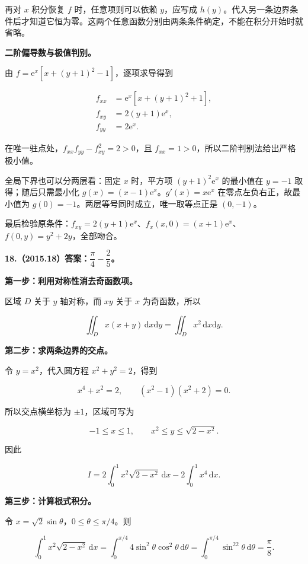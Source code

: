 \documentclass[UTF8,11pt,fontset=windows]{ctexart}
\begin{document}
再对 $x$ 积分恢复 $f$ 时，任意项则可以依赖 $y$，应写成 $h(y)$。代入另一条边界条件后才知道它恒为零。这两个任意函数分别由两条条件确定，不能在积分开始时就省略。

\textbf{二阶偏导数与极值判别。}

由 $f=\mathrm e^x[x+(y+1)^2-1]$，逐项求导得到

$$
\begin{aligned}
f_{xx}&=\mathrm e^x[x+(y+1)^2+1],\\
f_{xy}&=2(y+1)\mathrm e^x,\\
f_{yy}&=2\mathrm e^x.
\end{aligned}
$$

在唯一驻点处，$f_{xx}f_{yy}-f_{xy}^2=2>0$，且 $f_{xx}=1>0$，所以二阶判别法给出严格极小值。

全局下界也可以分两层看：固定 $x$ 时，平方项 $(y+1)^2\mathrm e^x$ 的最小值在 $y=-1$ 取得；随后只需最小化 $g(x)=(x-1)\mathrm e^x$。$g'(x)=x\mathrm e^x$ 在零点左负右正，故最小值为 $g(0)=-1$。两层等号同时成立，唯一取等点正是 $(0,-1)$。

最后检验原条件：$f_{xy}=2(y+1)\mathrm e^x$、$f_x(x,0)=(x+1)\mathrm e^x$、$f(0,y)=y^2+2y$，全部吻合。

\clearpage

\textbf{18.（2015.18）答案：$\dfrac\pi4-\dfrac25$。}

\textbf{第一步：利用对称性消去奇函数项。}

区域 $D$ 关于 $y$ 轴对称，而 $xy$ 关于 $x$ 为奇函数，所以

$$
\iint_D x(x+y)\,\mathrm dx\mathrm dy
=\iint_Dx^2\,\mathrm dx\mathrm dy.
$$

\textbf{第二步：求两条边界的交点。}

令 $y=x^2$，代入圆方程 $x^2+y^2=2$，得到

$$
x^4+x^2=2,
\qquad (x^2-1)(x^2+2)=0.
$$

所以交点横坐标为 $\pm1$，区域可写为

$$
-1\le x\le1,\qquad x^2\le y\le\sqrt{2-x^2}.
$$

因此

$$
I=2\int_0^1x^2\sqrt{2-x^2}\,\mathrm dx-2\int_0^1x^4\,\mathrm dx.
$$

\textbf{第三步：计算根式积分。}

令 $x=\sqrt2\sin\theta$，$0\le\theta\le\pi/4$。则

$$
\int_0^1x^2\sqrt{2-x^2}\,\mathrm dx
=\int_0^{\pi/4}4\sin^2\theta\cos^2\theta\,\mathrm d\theta
=\int_0^{\pi/4}\sin^22\theta\,\mathrm d\theta
=\frac\pi8.
$$
\end{document}
